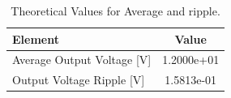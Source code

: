 \begin{table}[!ht]
    \centering
    \begin{tabular}{|l|c|}
    \hline
    {\bf Element } & {\bf Value } \\
    \hline \hline
    Average Output Voltage [V] & 1.2000e+01 \\   
    \hline
    Output Voltage Ripple [V] & 1.5813e-01 \\
    \hline
    \end{tabular}
    \caption{Theoretical Values for Average and ripple.}
    \label{tab:teotab1}
\end{table}
\newpage




